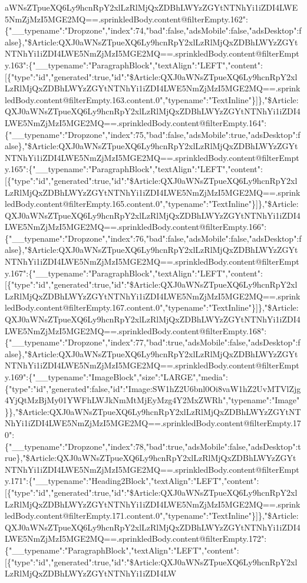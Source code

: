 aWNsZTpueXQ6Ly9hcnRpY2xlLzRlMjQxZDBhLWYzZGYtNTNhYi1iZDI4LWE5NmZjMzI5MGE2MQ==.sprinkledBody.content@filterEmpty.162":\{"\_\_typename":"Dropzone","index":74,"bad":false,"adsMobile":false,"adsDesktop":false\},"\$Article:QXJ0aWNsZTpueXQ6Ly9hcnRpY2xlLzRlMjQxZDBhLWYzZGYtNTNhYi1iZDI4LWE5NmZjMzI5MGE2MQ==.sprinkledBody.content@filterEmpty.163":\{"\_\_typename":"ParagraphBlock","textAlign":"LEFT","content":{[}\{"type":"id","generated":true,"id":"\$Article:QXJ0aWNsZTpueXQ6Ly9hcnRpY2xlLzRlMjQxZDBhLWYzZGYtNTNhYi1iZDI4LWE5NmZjMzI5MGE2MQ==.sprinkledBody.content@filterEmpty.163.content.0","typename":"TextInline"\}{]}\},"\$Article:QXJ0aWNsZTpueXQ6Ly9hcnRpY2xlLzRlMjQxZDBhLWYzZGYtNTNhYi1iZDI4LWE5NmZjMzI5MGE2MQ==.sprinkledBody.content@filterEmpty.164":\{"\_\_typename":"Dropzone","index":75,"bad":false,"adsMobile":true,"adsDesktop":false\},"\$Article:QXJ0aWNsZTpueXQ6Ly9hcnRpY2xlLzRlMjQxZDBhLWYzZGYtNTNhYi1iZDI4LWE5NmZjMzI5MGE2MQ==.sprinkledBody.content@filterEmpty.165":\{"\_\_typename":"ParagraphBlock","textAlign":"LEFT","content":{[}\{"type":"id","generated":true,"id":"\$Article:QXJ0aWNsZTpueXQ6Ly9hcnRpY2xlLzRlMjQxZDBhLWYzZGYtNTNhYi1iZDI4LWE5NmZjMzI5MGE2MQ==.sprinkledBody.content@filterEmpty.165.content.0","typename":"TextInline"\}{]}\},"\$Article:QXJ0aWNsZTpueXQ6Ly9hcnRpY2xlLzRlMjQxZDBhLWYzZGYtNTNhYi1iZDI4LWE5NmZjMzI5MGE2MQ==.sprinkledBody.content@filterEmpty.166":\{"\_\_typename":"Dropzone","index":76,"bad":false,"adsMobile":false,"adsDesktop":false\},"\$Article:QXJ0aWNsZTpueXQ6Ly9hcnRpY2xlLzRlMjQxZDBhLWYzZGYtNTNhYi1iZDI4LWE5NmZjMzI5MGE2MQ==.sprinkledBody.content@filterEmpty.167":\{"\_\_typename":"ParagraphBlock","textAlign":"LEFT","content":{[}\{"type":"id","generated":true,"id":"\$Article:QXJ0aWNsZTpueXQ6Ly9hcnRpY2xlLzRlMjQxZDBhLWYzZGYtNTNhYi1iZDI4LWE5NmZjMzI5MGE2MQ==.sprinkledBody.content@filterEmpty.167.content.0","typename":"TextInline"\}{]}\},"\$Article:QXJ0aWNsZTpueXQ6Ly9hcnRpY2xlLzRlMjQxZDBhLWYzZGYtNTNhYi1iZDI4LWE5NmZjMzI5MGE2MQ==.sprinkledBody.content@filterEmpty.168":\{"\_\_typename":"Dropzone","index":77,"bad":true,"adsMobile":false,"adsDesktop":false\},"\$Article:QXJ0aWNsZTpueXQ6Ly9hcnRpY2xlLzRlMjQxZDBhLWYzZGYtNTNhYi1iZDI4LWE5NmZjMzI5MGE2MQ==.sprinkledBody.content@filterEmpty.169":\{"\_\_typename":"ImageBlock","size":"LARGE","media":\{"type":"id","generated":false,"id":"Image:SW1hZ2U6bnl0Oi8vaW1hZ2UvMTVlZjg4YjQtMzBjMy01YWFhLWJkNmMtMjEyMzg4Y2MxZWRh","typename":"Image"\}\},"\$Article:QXJ0aWNsZTpueXQ6Ly9hcnRpY2xlLzRlMjQxZDBhLWYzZGYtNTNhYi1iZDI4LWE5NmZjMzI5MGE2MQ==.sprinkledBody.content@filterEmpty.170":\{"\_\_typename":"Dropzone","index":78,"bad":true,"adsMobile":false,"adsDesktop":true\},"\$Article:QXJ0aWNsZTpueXQ6Ly9hcnRpY2xlLzRlMjQxZDBhLWYzZGYtNTNhYi1iZDI4LWE5NmZjMzI5MGE2MQ==.sprinkledBody.content@filterEmpty.171":\{"\_\_typename":"Heading2Block","textAlign":"LEFT","content":{[}\{"type":"id","generated":true,"id":"\$Article:QXJ0aWNsZTpueXQ6Ly9hcnRpY2xlLzRlMjQxZDBhLWYzZGYtNTNhYi1iZDI4LWE5NmZjMzI5MGE2MQ==.sprinkledBody.content@filterEmpty.171.content.0","typename":"TextInline"\}{]}\},"\$Article:QXJ0aWNsZTpueXQ6Ly9hcnRpY2xlLzRlMjQxZDBhLWYzZGYtNTNhYi1iZDI4LWE5NmZjMzI5MGE2MQ==.sprinkledBody.content@filterEmpty.172":\{"\_\_typename":"ParagraphBlock","textAlign":"LEFT","content":{[}\{"type":"id","generated":true,"id":"\$Article:QXJ0aWNsZTpueXQ6Ly9hcnRpY2xlLzRlMjQxZDBhLWYzZGYtNTNhYi1iZDI4LW